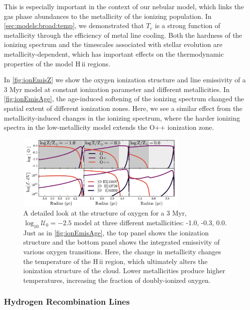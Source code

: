 \documentclass[linenumbers, trackchanges, tighten]{aastex61}%
\newcommand{\Fig}[1]{\autoref{fig:#1}}
\newcommand{\Sec}[1]{\autoref{sec:#1}}
\newcommand{\logten}{\ensuremath{\log_{10}}}
\newcommand{\Te}{\ensuremath{T_{e}}}
\newcommand{\hii}{H\,{\sc ii}\xspace}
\newcommand{\logU}{\ensuremath{\logten \mathcal{U}_0}}
\begin{document}
This is especially important in the context of our nebular model, which links the gas phase abundances to the metallicity of the ionizing population. In \Sec{models:broad:temp}, we demonstrated that \Te{} is a strong function of metallicity through the efficiency of metal line cooling. Both the hardness of the ionizing spectrum and the timescales associated with stellar evolution are metallicity-dependent, which has important effects on the thermodynamic properties of the model \hii regions.

In \Fig{ionEmisZ} we show the oxygen ionization structure and line emissivity of a 3 Myr model at constant ionization parameter and different metallicities. In \Fig{ionEmisAge}, the age-induced softening of the ionizing spectrum changed the spatial extent of different ionization zones. Here, we see a similar effect from the metallicity-induced changes in the ionizing spectrum, where the harder ionizing spectra in the low-metallicity model extends the O++ ionization zone.

\begin{figure}[!htbp]
  \begin{centering}
    \includegraphics[width=0.75\textwidth]{f8.pdf}
    \caption{A detailed look at the structure of oxygen for a 3 Myr, $\logU = -2.5$ model at three different metallicities: -1.0, -0.3, 0.0. Just as in \Fig{ionEmisAge}, the top panel shows the ionization structure and the bottom panel shows the integrated emissivity of various oxygen transitions. Here, the change in metallicity changes the temperature of the \hii region, which ultimately alters the ionization structure of the cloud. Lower metallicities produce higher temperatures, increasing the fraction of doubly-ionized oxygen.}
    \label{fig:ionEmisZ}
  \end{centering}
\end{figure}

\subsubsection{Hydrogen Recombination Lines} \label{sec:models:broad:H}
\end{document}
